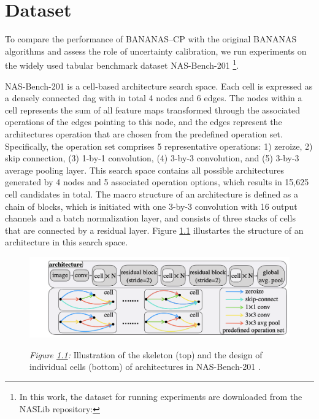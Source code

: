 \chapter{Dataset}
\label{ch: dataset}
To compare the performance of BANANAS--CP with the original BANANAS algorithms and assess the role of uncertainty calibration, we run experiments on the widely used tabular benchmark dataset NAS-Bench-201 \cite{dong2020nasbench201} \footnote{In this work, the dataset for running experiments are downloaded from the NASLib repository: }.

NAS-Bench-201 is a cell-based architecture search space. Each cell is expressed as a densely connected \gls{dag} with in total 4 nodes and 6 edges. The nodes within a cell represents the sum of all feature maps transformed through the associated operations of the edges pointing to this node, and the edges represent the architectures operation that are chosen from the predefined operation set. Specifically, the operation set comprises 5 representative operations: 1) zeroize, 2) skip connection, (3) 1-by-1 convolution, (4) 3-by-3 convolution, and (5) 3-by-3 average pooling layer. This search space contains all possible architectures generated by 4 nodes and 5 associated operation options, which results in 15,625 cell candidates in total. The macro structure of an architecture is defined as a chain of blocks, which is initiated with one 3-by-3 convolution with 16 output channels and a batch normalization layer, and consists of three stacks of cells that are connected by a residual layer. Figure \ref{fig: nasbench201} illustartes the structure of an architecture in this search space.  
 		
	\begin{figure}[bthp]
		\centering
		\includegraphics[scale=0.45]{figs/nas_bench_201.png}
		\label{fig: nasbench201}
			\parbox{\linewidth}{
	 		\vspace{0.5em}
 	 		{\small \textit{Figure \ref{fig: nasbench201}:} Illustration of the skeleton (top) and the design of individual cells (bottom) of architectures in NAS-Bench-201 \cite{dong2020nasbench201}.
 	 		}
 		}
		\end{figure}

